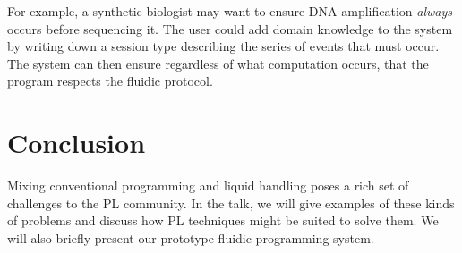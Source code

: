 \documentclass[
  10pt,
  a4paper,
  twocolumn,
]{article}
\begin{document}
For example, a synthetic biologist may want to ensure DNA amplification \emph{always} occurs before sequencing it.
The user could add domain knowledge to the system by writing down a session type describing the series of events that must occur.
The system can then ensure regardless of what computation occurs, that the program respects the fluidic protocol.

\section*{Conclusion}

Mixing conventional programming and liquid handling poses a rich set of challenges to the PL community.
In the talk, we will give examples of these kinds of problems and discuss how PL techniques might be suited to solve them.
We will also briefly present our prototype fluidic programming system.

\vfill

\renewcommand*{\bibfont}{\footnotesize}
\printbibliography[heading=none]
\end{document}
